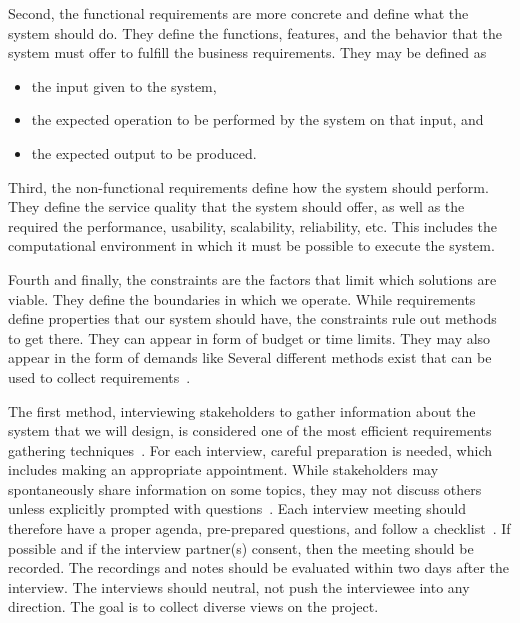 Second, the functional requirements are more concrete and define what the system should do.
They define the functions, features, and the behavior that the system must offer to fulfill the business requirements.
They may be defined as%
\begin{itemize}[noitemsep]%
\item the input given to the system,%
\item the expected operation to be performed by the system on that input, and%
\item the expected output to be produced.%
\end{itemize}%
%
Third, the non-functional requirements define how the system should perform.
They define the service quality that the system should offer, as well as the required the performance, usability, scalability, reliability, etc.
This includes the computational environment in which it must be possible to execute the system.

Fourth and finally, the constraints are the factors that limit which solutions are viable.
They define the boundaries in which we operate.
While requirements define properties that our system should have, the constraints rule out methods to get there.
They can appear in form of budget or time limits.
They may also appear in the form of demands like \emph{}%
\endhsection%
%
%
%
Several different methods exist that can be used to collect requirements~\cite{S2003ISA6P:RDARS}.

The first method, interviewing stakeholders to gather information about the system that we will design, is considered one of the most efficient requirements gathering techniques~\cite{DTHJM2006EORETERDFASR,S2003ISA6P:RDARS}.
For each interview, careful preparation is needed, which includes making an appropriate appointment.
While stakeholders may spontaneously share information on some topics, they may not discuss others unless explicitly prompted with questions~\cite{BJF2014WSWOWNSATAESOTIIREEI}.
Each interview meeting should therefore have a proper agenda, pre-prepared questions, and follow a checklist~\cite{WSEG2016ETIOAKOSTCORQQ}.
If possible and if the interview partner(s) consent, then the meeting should be recorded.
The recordings and notes should be evaluated within two days after the interview.
The interviews should neutral, not push the interviewee into any direction.
The goal is to collect diverse views on the project.

